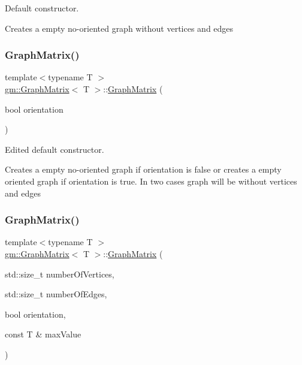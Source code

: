 Default constructor. 

Creates a empty no-\/oriented graph without vertices and edges \mbox{\label{classgm_1_1_graph_matrix_a24ab316e39e3a26c9208c81af0e3e48d}} 
\subsubsection{\texorpdfstring{Graph\+Matrix()}{GraphMatrix()}\hspace{0.1cm}{\footnotesize\ttfamily [2/3]}}
{\footnotesize\ttfamily template$<$typename T $>$ \\
\mbox{\hyperlink{classgm_1_1_graph_matrix}{gm\+::\+Graph\+Matrix}}$<$ T $>$\+::\mbox{\hyperlink{classgm_1_1_graph_matrix}{Graph\+Matrix}} (\begin{DoxyParamCaption}\item[{bool}]{orientation }\end{DoxyParamCaption})}



Edited default constructor. 

Creates a empty no-\/oriented graph if orientation is false or creates a empty oriented graph if orientation is true. In two cases graph will be without vertices and edges \mbox{\label{classgm_1_1_graph_matrix_a091be187f54bd8fc750696c4e97e9552}} 
\subsubsection{\texorpdfstring{Graph\+Matrix()}{GraphMatrix()}\hspace{0.1cm}{\footnotesize\ttfamily [3/3]}}
{\footnotesize\ttfamily template$<$typename T $>$ \\
\mbox{\hyperlink{classgm_1_1_graph_matrix}{gm\+::\+Graph\+Matrix}}$<$ T $>$\+::\mbox{\hyperlink{classgm_1_1_graph_matrix}{Graph\+Matrix}} (\begin{DoxyParamCaption}\item[{std\+::size\+\_\+t}]{number\+Of\+Vertices,  }\item[{std\+::size\+\_\+t}]{number\+Of\+Edges,  }\item[{bool}]{orientation,  }\item[{const T \&}]{max\+Value }\end{DoxyParamCaption})}



